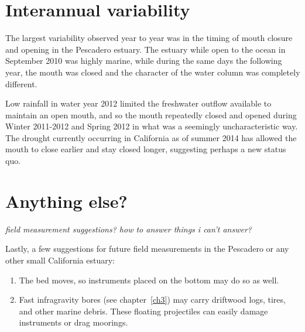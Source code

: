 \section{Interannual variability} \label{IntannVar}

The largest variability observed year to year was in the timing of mouth closure and opening in the Pescadero estuary. The estuary while open to the ocean in September 2010 was highly marine, while during the same days the following year, the mouth was closed and the character of the water column was completely different. 

Low rainfall in water year 2012 limited the freshwater outflow available to maintain an open mouth, and so the mouth repeatedly closed and opened during Winter 2011-2012 and Spring 2012 in what was a seemingly uncharacteristic way. The drought currently occurring in California as of summer 2014 has allowed the mouth to close earlier and stay closed longer, suggesting perhaps a new status quo. 

\section{Anything else?} \label{backofch2}

\emph{field measurement suggestions? how to answer things i can't
answer?}

Lastly, a few suggestions for future field measurements in the Pescadero or any other small California estuary: 
\begin{enumerate}
	\item The bed moves, so instruments placed on the bottom may do so as well.
	\item Fast infragravity bores (see chapter~\ref{ch3}) may carry driftwood logs, tires, and other marine debris. These floating projectiles can easily damage instruments or drag moorings.
\end{enumerate}


